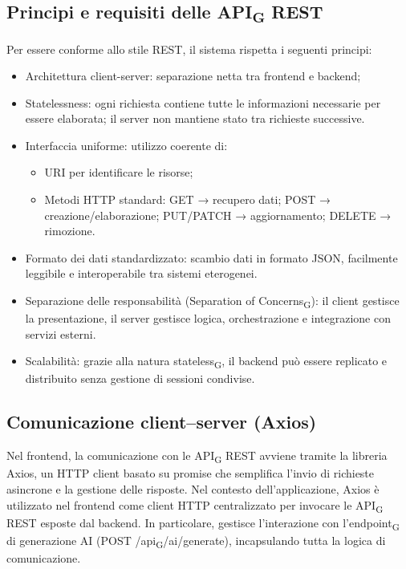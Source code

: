 \documentclass[11pt,a4paper]{article}
\newcommand{\gls}[1]{#1\textsubscript{G}}
\begin{document}
\subsection{Principi e requisiti delle \gls{API} REST}
Per essere conforme allo stile REST, il sistema rispetta i seguenti principi:
\begin{itemize}
\item Architettura client-server: separazione netta tra frontend e backend;
\item Statelessness: ogni richiesta contiene tutte le informazioni necessarie per essere elaborata; il server non mantiene stato tra richieste successive.
\item Interfaccia uniforme: utilizzo coerente di:
\begin{itemize}
\item URI per identificare le risorse;
\item Metodi HTTP standard:
GET → recupero dati;
POST → creazione/elaborazione;
PUT/PATCH → aggiornamento;
DELETE → rimozione.
\end{itemize}
\item Formato dei dati standardizzato: scambio dati in formato JSON, facilmente leggibile e interoperabile tra sistemi eterogenei.
\item Separazione delle responsabilità (\gls{Separation of Concerns}): il client gestisce la presentazione, il server gestisce logica, orchestrazione e integrazione con servizi esterni.
\item Scalabilità: grazie alla natura \gls{stateless}, il backend può essere replicato e distribuito senza gestione di sessioni condivise.
\end{itemize}

\subsection{Comunicazione client–server (Axios)}
Nel frontend, la comunicazione con le \gls{API} REST avviene tramite la libreria Axios, un HTTP client basato su promise che semplifica l’invio di richieste asincrone e la gestione delle risposte. 
Nel contesto dell’applicazione, Axios è utilizzato nel frontend come client HTTP centralizzato per invocare le \gls{API} REST esposte dal backend. In particolare, gestisce l’interazione con l’\gls{endpoint} di generazione AI (POST /\gls{api}/ai/generate), incapsulando tutta la logica di comunicazione.
\end{document}
